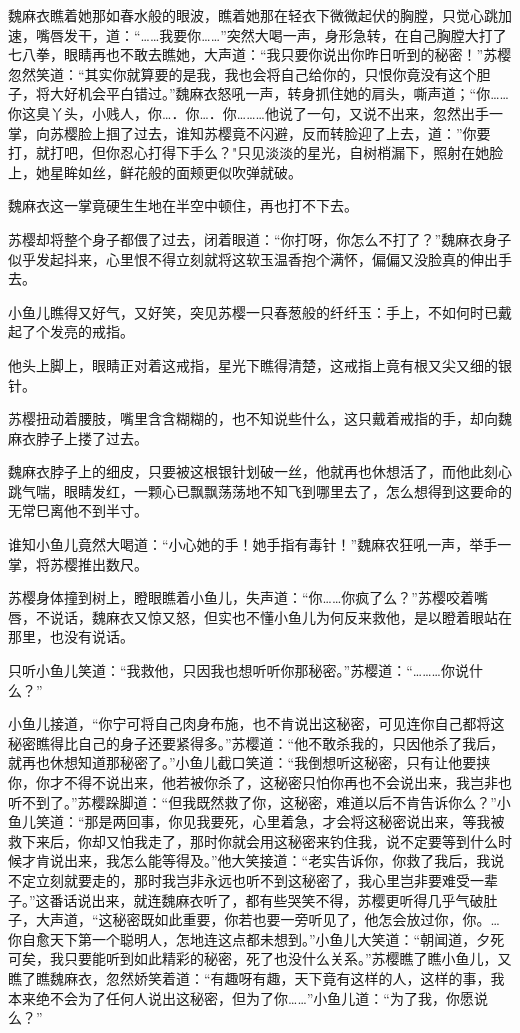 \documentclass[12pt,oneside]{book}
\begin{document}
魏麻衣瞧着她那如春水般的眼波，瞧着她那在轻衣下微微起伏的胸膛，只觉心跳加速，嘴唇发干，道：``\ldots\ldots 我要你\ldots\ldots{}''突然大喝一声，身形急转，在自己胸膛大打了七八拳，眼睛再也不敢去瞧她，大声道：``我只要你说出你昨日听到的秘密！''苏樱忽然笑道：``其实你就算要的是我，我也会将自己给你的，只恨你竟没有这个胆子，将大好机会平白错过。''魏麻衣怒吼一声，转身抓住她的肩头，嘶声道；``你\ldots\ldots 你这臭丫头，小贱人，你\ldots．你\ldots．你\ldots\ldots\ldots 他说了一句，又说不出来，忽然出手一掌，向苏樱脸上掴了过去，谁知苏樱竟不闪避，反而转脸迎了上去，道：''你要打，就打吧，但你忍心打得下手么？"只见淡淡的星光，自树梢漏下，照射在她脸上，她星眸如丝，鲜花般的面颊更似吹弹就破。

魏麻衣这一掌竟硬生生地在半空中顿住，再也打不下去。

苏樱却将整个身子都偎了过去，闭着眼道：``你打呀，你怎么不打了？''魏麻衣身子似乎发起抖来，心里恨不得立刻就将这软玉温香抱个满怀，偏偏又没脸真的伸出手去。

小鱼儿瞧得又好气，又好笑，突见苏樱一只春葱般的纤纤玉：手上，不如何时已戴起了个发亮的戒指。

他头上脚上，眼睛正对着这戒指，星光下瞧得清楚，这戒指上竟有根又尖又细的银针。

苏樱扭动着腰肢，嘴里含含糊糊的，也不知说些什么，这只戴着戒指的手，却向魏麻衣脖子上搂了过去。

魏麻衣脖子上的细皮，只要被这根银针划破一丝，他就再也休想活了，而他此刻心跳气喘，眼睛发红，一颗心已飘飘荡荡地不知飞到哪里去了，怎么想得到这要命的无常巳离他不到半寸。

谁知小鱼儿竟然大喝道：``小心她的手！她手指有毒针！''魏麻农狂吼一声，举手一掌，将苏樱推出数尺。

苏樱身体撞到树上，瞪眼瞧着小鱼儿，失声道：``你\ldots\ldots 你疯了么？''苏樱咬着嘴唇，不说话，魏麻衣又惊又怒，但实也不懂小鱼儿为何反来救他，是以瞪着眼站在那里，也没有说话。

只听小鱼儿笑道：``我救他，只因我也想听听你那秘密。''苏樱道：``\ldots\ldots\ldots 你说什么？''

小鱼儿接道，``你宁可将自己肉身布施，也不肯说出这秘密，可见连你自己都将这秘密瞧得比自己的身子还要紧得多。''苏樱道：``他不敢杀我的，只因他杀了我后，就再也休想知道那秘密了。''小鱼儿截口笑道：``我倒想听这秘密，只有让他要挟你，你才不得不说出来，他若被你杀了，这秘密只怕你再也不会说出来，我岂非也听不到了。''苏樱跺脚道：``但我既然救了你，这秘密，难道以后不肯告诉你么？''小鱼儿笑道：``那是两回事，你见我要死，心里着急，才会将这秘密说出来，等我被救下来后，你却又怕我走了，那时你就会用这秘密来钓住我，说不定要等到什么时候才肯说出来，我怎么能等得及。''他大笑接道：``老实告诉你，你救了我后，我说不定立刻就要走的，那时我岂非永远也听不到这秘密了，我心里岂非要难受一辈子。''这番话说出来，就连魏麻衣听了，都有些哭笑不得，苏樱更听得几乎气破肚子，大声道，``这秘密既如此重要，你若也要一旁听见了，他怎会放过你，你。\ldots 你自愈天下第一个聪明人，怎地连这点都未想到。''小鱼儿大笑道：``朝闻道，夕死可矣，我只要能听到如此精彩的秘密，死了也没什么关系。''苏樱瞧了瞧小鱼儿，又瞧了瞧魏麻衣，忽然娇笑着道：``有趣呀有趣，天下竟有这样的人，这样的事，我本来绝不会为了任何人说出这秘密，但为了你\ldots\ldots{}''小鱼儿道：``为了我，你愿说么？''
\end{document}
